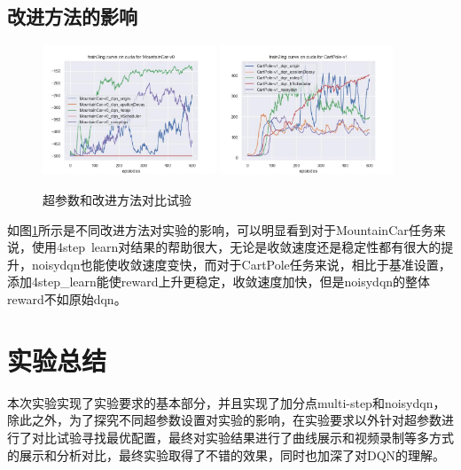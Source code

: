 \documentclass[a4paper]{ctexart}
\begin{document}
\subsection{改进方法的影响}
\begin{figure}[H]
    \centering
    \includegraphics[width=0.46\textwidth]{train6.jpg}
    \includegraphics[width=0.46\textwidth]{train7.jpg}
    \caption{超参数和改进方法对比试验}
    \label{d}
\end{figure}
如图\ref{d}所示是不同改进方法对实验的影响，可以明显看到对于MountainCar任务来说，使用4step\ learn对结果的帮助很大，无论是收敛速度还是稳定性都有很大的提升，noisydqn也能使收敛速度变快，而对于CartPole任务来说，相比于基准设置，添加4step\_learn能使reward上升更稳定，收敛速度加快，但是noisydqn的整体reward不如原始dqn。


\section{实验总结}
本次实验实现了实验要求的基本部分，并且实现了加分点multi-step和noisydqn，除此之外，为了探究不同超参数设置对实验的影响，在实验要求以外针对超参数进行了对比试验寻找最优配置，最终对实验结果进行了曲线展示和视频录制等多方式的展示和分析对比，最终实验取得了不错的效果，同时也加深了对DQN的理解。
\end{document}
